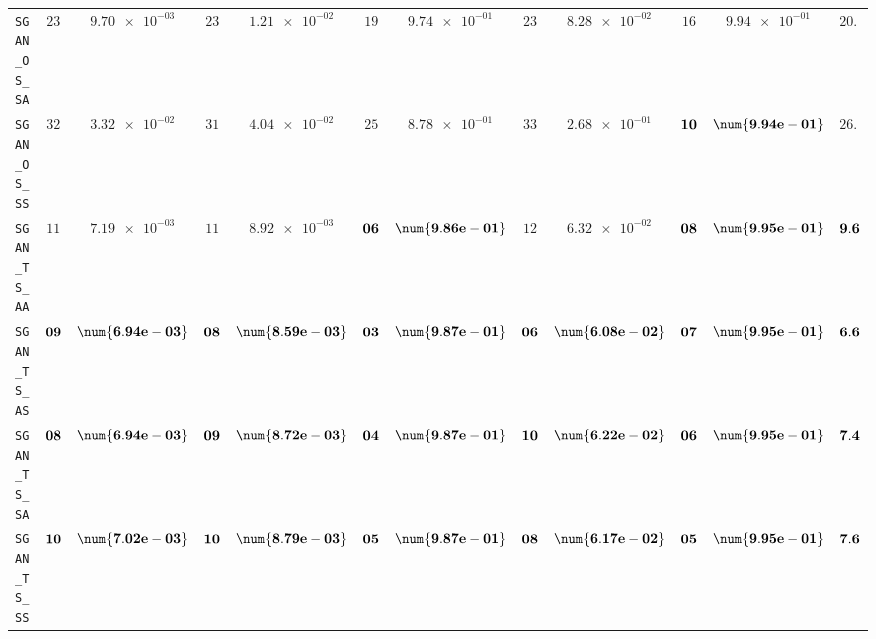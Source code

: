 \begin{xltabular}{\textwidth}{l||cC|cC|cC|cC|cC||c}
	\texttt{SGAN\_OS\_SA} & $ 23$ & $ \num{9.70e-03}$ & $ 23$ & $ \num{1.21e-02}$ & $ 19$ & $ \num{9.74e-01}$ & $ 23$ & $ \num{8.28e-02}$ & $ 16$ & $ \num{9.94e-01}$ & $ 20.8$  \\
	\texttt{SGAN\_OS\_SS} & $ 32$ & $ \num{3.32e-02}$ & $ 31$ & $ \num{4.04e-02}$ & $ 25$ & $ \num{8.78e-01}$ & $ 33$ & $ \num{2.68e-01}$ & $\bf 10$ & $\bf \num{9.94e-01}$ & $ 26.2$  \\
	\texttt{SGAN\_TS\_AA} & $ 11$ & $ \num{7.19e-03}$ & $ 11$ & $ \num{8.92e-03}$ & $\bf 06$ & $\bf \num{9.86e-01}$ & $ 12$ & $ \num{6.32e-02}$ & $\bf 08$ & $\bf \num{9.95e-01}$ & $\bf 9.6$  \\
	\texttt{SGAN\_TS\_AS} & $\bf 09$ & $\bf \num{6.94e-03}$ & $\bf 08$ & $\bf \num{8.59e-03}$ & $\bf 03$ & $\bf \num{9.87e-01}$ & $\bf 06$ & $\bf \num{6.08e-02}$ & $\bf 07$ & $\bf \num{9.95e-01}$ & $\bf 6.6$  \\
	\texttt{SGAN\_TS\_SA} & $\bf 08$ & $\bf \num{6.94e-03}$ & $\bf 09$ & $\bf \num{8.72e-03}$ & $\bf 04$ & $\bf \num{9.87e-01}$ & $\bf 10$ & $\bf \num{6.22e-02}$ & $\bf 06$ & $\bf \num{9.95e-01}$ & $\bf 7.4$  \\
	\texttt{SGAN\_TS\_SS} & $\bf 10$ & $\bf \num{7.02e-03}$ & $\bf 10$ & $\bf \num{8.79e-03}$ & $\bf 05$ & $\bf \num{9.87e-01}$ & $\bf 08$ & $\bf \num{6.17e-02}$ & $\bf 05$ & $\bf \num{9.95e-01}$ & $\bf 7.6$  \\ \midrule

\end{xltabular}
